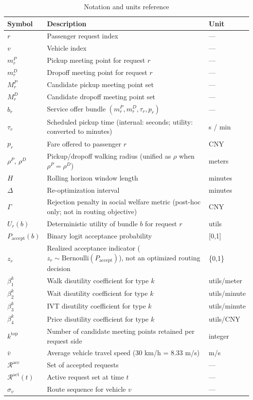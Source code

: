 \documentclass[a4paper,fleqn]{b-els-cas-templates-模版/cas-dc}
\begin{document}
\begin{table}[width=\textwidth,pos=t]
\centering
\caption{Notation and units reference}
\label{tab:notation}
\small
\begin{tabular}{p{}p{}p{}}
\toprule
Symbol & Description & Unit \\
\midrule
$r$ & Passenger request index & --- \\
$v$ & Vehicle index & --- \\
$m_r^P$ & Pickup meeting point for request $r$ & --- \\
$m_r^D$ & Dropoff meeting point for request $r$ & --- \\
$M_r^P$ & Candidate pickup meeting point set & --- \\
$M_r^D$ & Candidate dropoff meeting point set & --- \\
$b_r$ & Service offer bundle $(m_r^P, m_r^D, \tau_r, p_r)$ & --- \\
$\tau_r$ & Scheduled pickup time (internal: seconds; utility: converted to minutes) & s / min \\
$p_r$ & Fare offered to passenger $r$ & CNY \\
$\rho^P$, $\rho^D$ & Pickup/dropoff walking radius (unified as $\rho$ when $\rho^P = \rho^D$) & meters \\
$H$ & Rolling horizon window length & minutes \\
$\Delta$ & Re-optimization interval & minutes \\
$\Gamma$ & Rejection penalty in social welfare metric (post-hoc only; not in routing objective) & CNY \\
$U_r(b)$ & Deterministic utility of bundle $b$ for request $r$ & utils \\
$P_{\text{accept}}(b)$ & Binary logit acceptance probability & [0,1] \\
$z_r$ & Realized acceptance indicator ($z_r \sim \text{Bernoulli}(P_{\text{accept}})$), not an optimized routing decision & \{0,1\} \\
$\beta_1^k$ & Walk disutility coefficient for type $k$ & utils/meter \\
$\beta_2^k$ & Wait disutility coefficient for type $k$ & utils/minute \\
$\beta_3^k$ & IVT disutility coefficient for type $k$ & utils/minute \\
$\beta_4^k$ & Price disutility coefficient for type $k$ & utils/CNY \\
$k^{\text{top}}$ & Number of candidate meeting points retained per request side & integer \\
$\bar{v}$ & Average vehicle travel speed (30 km/h = 8.33 m/s) & m/s \\
$\mathcal{R}^{\text{acc}}$ & Set of accepted requests & --- \\
$\mathcal{R}^{\text{act}}(t)$ & Active request set at time $t$ & --- \\
$\sigma_v$ & Route sequence for vehicle $v$ & --- \\
\bottomrule
\end{tabular}
\end{table}
\end{document}
